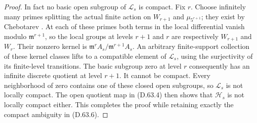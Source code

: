 \begin{proof}
In fact no basic open subgroup of \(\mathcal L_s\)
is compact. Fix \(r\). Choose infinitely many primes
splitting the actual finite action on \(W_{r+1}\)
and \(\mu_{5^{r+1}}\); they exist by Chebotarev
\cite[Chapter V, Theorem 3.23]{PBC_MilneCFT}.
At each of these primes both terms in the local
differential vanish modulo \(\mathfrak m^{r+1}\),
so the local groups at levels \(r+1\) and \(r\)
are respectively \(W_{r+1}\) and \(W_r\).
Their nonzero kernel is
\(\mathfrak m^rA_s/\mathfrak m^{r+1}A_s\).
An arbitrary finite-support collection of these
kernel classes lifts to a compatible element of
\(\mathcal L_s\), using the surjectivity of its
finite-level transitions. The basic subgroup zero
at level \(r\) consequently has an infinite discrete
quotient at level \(r+1\). It cannot be compact.
Every neighborhood of zero contains one of these
closed open subgroups, so \(\mathcal L_s\) is not
locally compact. The open quotient map in (D.63.4)
then shows that \(\mathcal H_s\) is not locally
compact either. This completes the proof while
retaining exactly the compact ambiguity in (D.63.6).
\end{proof}
